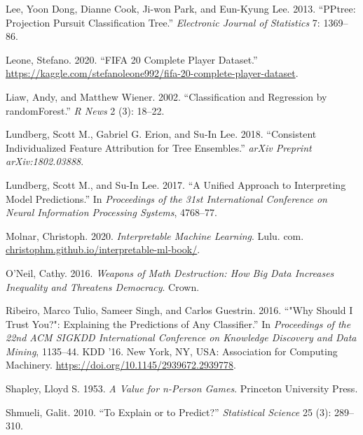 \documentclass[
]{article}
\newlength{\cslhangindent}
\newlength{\cslentryspacingunit} %
\newenvironment{CSLReferences}[2] %
 {%
  \setlength{\parindent}{0pt}
  \ifodd #1
  \let\oldpar\par
  \def\par{\hangindent=\cslhangindent\oldpar}
  \fi
  \setlength{\parskip}{#2\cslentryspacingunit}
 }%
 {}
\begin{document}
\begin{CSLReferences}{1}{0}
\leavevmode{}%
Lee, Yoon Dong, Dianne Cook, Ji-won Park, and Eun-Kyung Lee. 2013. {``{PPtree}: {Projection} Pursuit Classification Tree.''} \emph{Electronic Journal of Statistics} 7: 1369--86.

\leavevmode{}%
Leone, Stefano. 2020. {``{FIFA} 20 Complete Player Dataset.''} \url{https://kaggle.com/stefanoleone992/fifa-20-complete-player-dataset}.

\leavevmode{}%
Liaw, Andy, and Matthew Wiener. 2002. {``Classification and Regression by {randomForest}.''} \emph{R News} 2 (3): 18--22.

\leavevmode{}%
Lundberg, Scott M., Gabriel G. Erion, and Su-In Lee. 2018. {``Consistent Individualized Feature Attribution for Tree Ensembles.''} \emph{arXiv Preprint arXiv:1802.03888}.

\leavevmode{}%
Lundberg, Scott M., and Su-In Lee. 2017. {``A Unified Approach to Interpreting Model Predictions.''} In \emph{Proceedings of the 31st International Conference on Neural Information Processing Systems}, 4768--77.

\leavevmode{}%
Molnar, Christoph. 2020. \emph{Interpretable Machine Learning}. Lulu. com. \href{https://christophm.github.io/interpretable-ml-book/}{christophm.github.io/interpretable-ml-book/}.

\leavevmode{}%
O'Neil, Cathy. 2016. \emph{Weapons of Math Destruction: {How} Big Data Increases Inequality and Threatens Democracy}. Crown.

\leavevmode{}%
Ribeiro, Marco Tulio, Sameer Singh, and Carlos Guestrin. 2016. {``"{Why} {Should} {I} {Trust} {You}?": {Explaining} the {Predictions} of {Any} {Classifier}.''} In \emph{Proceedings of the 22nd {ACM} {SIGKDD} {International} {Conference} on {Knowledge} {Discovery} and {Data} {Mining}}, 1135--44. {KDD} '16. New York, NY, USA: Association for Computing Machinery. \url{https://doi.org/10.1145/2939672.2939778}.

\leavevmode{}%
Shapley, Lloyd S. 1953. \emph{A Value for n-Person Games}. Princeton University Press.

\leavevmode{}%
Shmueli, Galit. 2010. {``To Explain or to Predict?''} \emph{Statistical Science} 25 (3): 289--310.


\end{CSLReferences}
\end{document}
